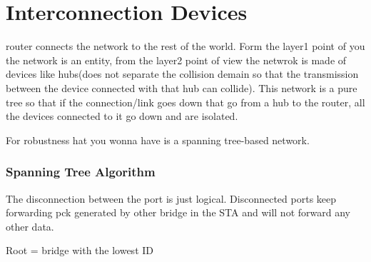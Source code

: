 \chapter{Interconnection Devices}
router connects the network to the rest of the world. Form the layer1 point of you the network is an entity, from the layer2 point of view the netwrok is made of devices like hubs(does not separate the collision demain so that the transmission between the device connected with that hub can collide). 
This network is a pure tree so that if the connection/link goes down that go from a hub to the router, all the devices connected to it go down and are isolated.

For robustness hat you wonna have is a spanning tree-based network.


\subsection{Spanning Tree Algorithm}
The disconnection between the port is just logical. Disconnected ports keep forwarding pck generated by other bridge in the STA and will not forward any other data. 

Root = bridge with the lowest ID 

